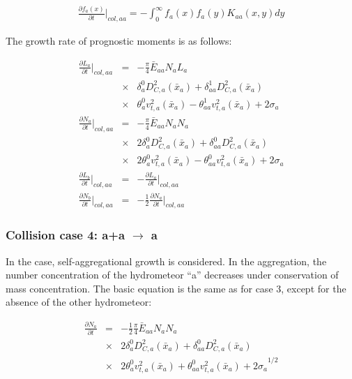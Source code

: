\begin{eqnarray}
\frac{\partial f_{a}(x)}{\partial t}\Bigr|_{col,aa}=-\int_{0}^{\infty}f_{a}(x)f_{a}(y)K_{aa}(x,y)dy\label{sn199}
\end{eqnarray}

The growth rate of prognostic moments is as follows:

\begin{eqnarray}
\frac{\partial L_{a}}{\partial t}\Bigr|_{col,aa}&=&-\frac{\pi}{4}\bar{E}_{aa}{N_{a}}{L_{a}}\nonumber\\
&\times&{\delta_{a}^{0}D_{C,a}^{2}(\bar{x}_{a})+\delta_{aa}^{1}D_{C,a}^{2}(\bar{x}_{a})}\nonumber\\
&\times&{\theta_{a}^{0}v_{t,a}^{2}(\bar{x}_{a})-\theta_{aa}^{1}v_{t,a}^{2}(\bar{x}_{a})+2\sigma_{a}}\label{sn200}\\
\frac{\partial N_{a}}{\partial t}\Bigr|_{col,aa}&=&-\frac{\pi}{4}\bar{E}_{aa}{N_{a}}{N_{a}}\nonumber\\
&\times&{2\delta_{a}^{0}D_{C,a}^{2}(\bar{x}_{a})+\delta_{aa}^{0}D_{C,a}^{2}(\bar{x}_{a})}\nonumber\\
&\times&{2\theta_{a}^{0}v_{t,a}^{2}(\bar{x}_{a})-\theta_{aa}^{0}v_{t,a}^{2}(\bar{x}_{a})+2\sigma_{a}}\label{sn201}\\
\frac{\partial L_{b}}{\partial t}\Bigr|_{col,aa}&=&-\frac{\partial L_{a}}{\partial t}\Bigr|_{col,aa}\label{sn202}\\
\frac{\partial N_{b}}{\partial t}\Bigr|_{col,aa}&=&-\frac{1}{2}\frac{\partial N_{a}}{\partial t}\Bigr|_{col,aa}\label{sn203}
\end{eqnarray}


\subsubsection{Collision case 4: a+a $\rightarrow$ a}
In the case, self-aggregational growth is considered. In the aggregation, the number concentration of the hydrometeor “a” decreases under conservation of mass concentration. The basic equation is the same as for case 3, except for the absence of the other hydrometeor:

\begin{eqnarray}
\frac{\partial N_{a}}{\partial t}&=&-\frac{1}{2}\frac{\pi}{4}\bar{E}_{aa}N_{a}N_{a}\nonumber\\
&\times&{2\delta_{a}^{0}D_{C,a}^{2}(\bar{x}_{a})+\delta_{aa}^{0}D_{C,a}^{2}(\bar{x}_{a})}\nonumber\\
&\times&{2\theta_{a}^{0}v_{t,a}^{2}(\bar{x}_{a})+\theta_{aa}^{0}v_{t,a}^{2}(\bar{x}_{a})+2\sigma_{a}}^{1/2}\label{sn204}
\end{eqnarray}

